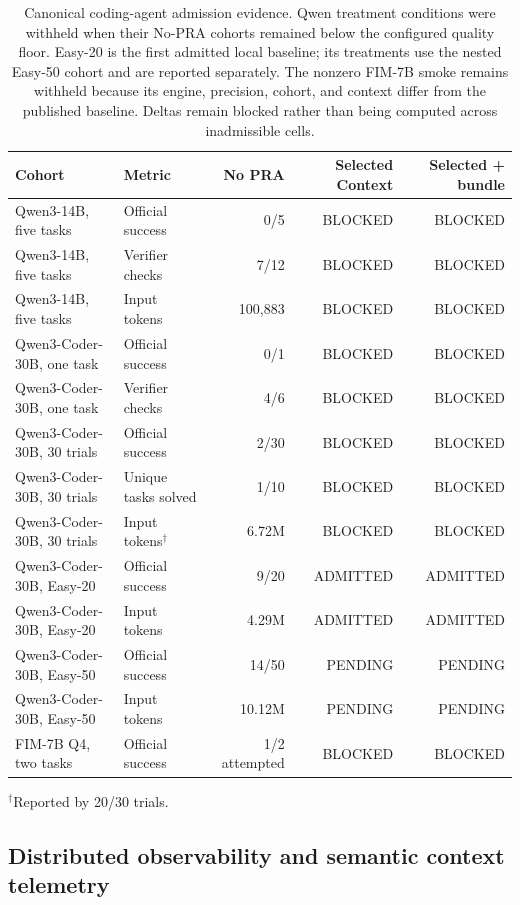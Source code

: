 \documentclass[11pt]{article}
\begin{document}
\begin{table}[H]
\centering
\small
\caption{Canonical coding-agent admission evidence. Qwen treatment conditions
were withheld when their No-PRA cohorts remained below the configured quality
floor. Easy-20 is the first admitted local baseline; its treatments use the
nested Easy-50 cohort and are reported separately. The nonzero FIM-7B smoke
remains withheld because its engine, precision, cohort, and context differ from
the published baseline. Deltas remain blocked rather than being computed across
inadmissible cells.}
\begin{tabular}{llrrr}
\toprule
Cohort & Metric & No PRA & Selected Context & Selected + bundle \\
\midrule
Qwen3-14B, five tasks & Official success & 0/5 & BLOCKED & BLOCKED \\
Qwen3-14B, five tasks & Verifier checks & 7/12 & BLOCKED & BLOCKED \\
Qwen3-14B, five tasks & Input tokens & 100,883 & BLOCKED & BLOCKED \\
Qwen3-Coder-30B, one task & Official success & 0/1 & BLOCKED & BLOCKED \\
Qwen3-Coder-30B, one task & Verifier checks & 4/6 & BLOCKED & BLOCKED \\
Qwen3-Coder-30B, 30 trials & Official success & 2/30 & BLOCKED & BLOCKED \\
Qwen3-Coder-30B, 30 trials & Unique tasks solved & 1/10 & BLOCKED & BLOCKED \\
Qwen3-Coder-30B, 30 trials & Input tokens$^{\dagger}$ & 6.72M & BLOCKED & BLOCKED \\
Qwen3-Coder-30B, Easy-20 & Official success & 9/20 & ADMITTED & ADMITTED \\
Qwen3-Coder-30B, Easy-20 & Input tokens & 4.29M & ADMITTED & ADMITTED \\
Qwen3-Coder-30B, Easy-50 & Official success & 14/50 & PENDING & PENDING \\
Qwen3-Coder-30B, Easy-50 & Input tokens & 10.12M & PENDING & PENDING \\
FIM-7B Q4, two tasks & Official success & 1/2 attempted & BLOCKED & BLOCKED \\
\bottomrule
\end{tabular}
\par\vspace{2pt}\footnotesize $^{\dagger}$Reported by 20/30 trials.
\label{tab:agent-canonical-gate}
\end{table}

\subsection{Distributed observability and semantic context telemetry}
\end{document}
